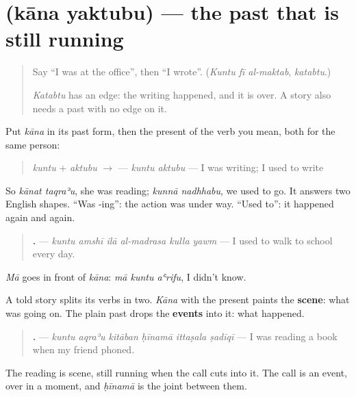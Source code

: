 \section[\texorpdfstring{\ar{كان} \ar{يكتب} (kāna yaktubu)}{كان يكتب (kāna yaktubu)}]{  (kāna yaktubu) — the past that is still running}

\label{lesson:AR-C283-kana-yaktubu}



\begin{quote}
Say \textquotedblleft{}I was at the office\textquotedblright{}, then \textquotedblleft{}I wrote\textquotedblright{}. (\emph{Kuntu fī al-maktab}, \emph{katabtu}.)

\emph{Katabtu} has an edge: the writing happened, and it is over. A story also needs a past with no edge on it.
\end{quote}

\begin{grammarlens}[title={Grammar Lens: kāna in front of the present}]
Put \emph{kāna} in its past form, then the present of the verb you mean, both for the same person:

\begin{quote}
\emph{kuntu} + \emph{aktubu} $\to$ \textbf{ } — \emph{kuntu aktubu} — I was writing; I used to write
\end{quote}

So \emph{kānat taqraʾu}, she was reading; \emph{kunnā nadhhabu}, we used to go. It answers two English shapes. \textquotedblleft{}Was ‑ing\textquotedblright{}: the action was under way. \textquotedblleft{}Used to\textquotedblright{}: it happened again and again.

\begin{quote}
\textbf{     .} — \emph{kuntu amshī ilā al-madrasa kulla yawm} — I used to walk to school every day.
\end{quote}

\emph{Mā} goes in front of \emph{kāna}: \emph{mā kuntu aʿrifu}, I didn't know.
\end{grammarlens}

\begin{grammarlens}[title={Grammar Lens: the scene, and the event}]
A told story splits its verbs in two. \emph{Kāna} with the present paints the \textbf{scene}: what was going on. The plain past drops the \textbf{events} into it: what happened.

\begin{quote}
\textbf{     .} — \emph{kuntu aqraʾu kitāban ḥīnamā ittaṣala ṣadīqī} — I was reading a book when my friend phoned.
\end{quote}

The reading is scene, still running when the call cuts into it. The call is an event, over in a moment, and \emph{ḥīnamā} is the joint between them.
\end{grammarlens}

